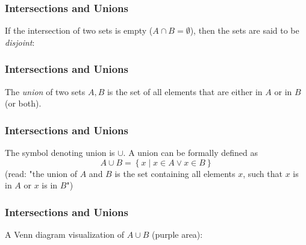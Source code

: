 \begin{frame}
  \frametitle{Intersections and Unions}
  If the intersection of two sets is empty ($A\cap B=\emptyset$), then the sets are said to be \emph{disjoint}:
  \begin{figure}[H]
    \centering
  \end{figure}
\end{frame}

\begin{frame}
  \frametitle{Intersections and Unions}
  \begin{presentation_definition}
    The \emph{union} of two sets $A,B$ is the set of all elements that are either in $A$ or in $B$ (or both).
  \end{presentation_definition}

\end{frame}

\begin{frame}
  \frametitle{Intersections and Unions}
  The symbol denoting union is $\cup$. A union can be formally defined as
  \begin{equation*}
    A\cup B = \left\{ x \mid x\in A \vee x\in B \right\}
  \end{equation*}
  (read: "the union of $A$ and $B$ is the set containing all elements $x$, such that $x$ is in $A$ or $x$ is in $B$")
\end{frame}

\begin{frame}
  \frametitle{Intersections and Unions}
  A Venn diagram visualization of $A\cup B$ (purple area):
  \begin{figure}[H]
    \centering
  \end{figure}
\end{frame}

